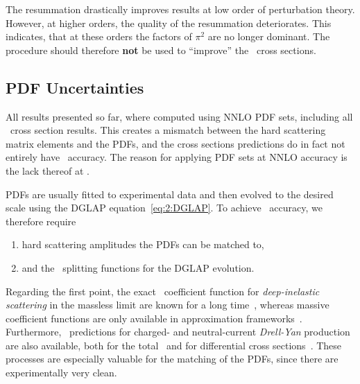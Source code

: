 The resummation drastically improves results at low order of perturbation theory. However, at higher orders, the quality of the resummation deteriorates. This indicates, that at these orders the factors of $\pi^2$ are no longer dominant. The procedure should therefore \textbf{not} be used to ``improve'' the \NNNLO\ cross sections.

\subsection{PDF Uncertainties}
All results presented so far, where computed using \acs{NNLO} \acs{PDF} sets, including all \NNNLO\ cross section results. This creates a mismatch between the hard scattering matrix elements and the \acs{PDF}s, and the cross sections predictions do in fact not entirely have \NNNLO\ accuracy. The reason for applying \acs{PDF} sets at \acs{NNLO} accuracy is the lack thereof at \NNNLO.

\acs{PDF}s are usually fitted to experimental data and then evolved to the desired scale using the DGLAP equation~\eqref{eq:2:DGLAP}. To achieve \NNNLO\ accuracy, we therefore require
\begin{enumerate}
  \item hard scattering amplitudes the \acs{PDF}s can be matched to,
  \item and the \NNNLO\ splitting functions for the DGLAP evolution.
\end{enumerate}
Regarding the first point, the exact \NNNLO\ coefficient function for \textit{deep-inelastic scattering} in the massless limit are known for a long time~\cite{Vermaseren:2005qc, Moch:2004xu, Moch:2007rq, Moch:2008fj, Davies:2016ruz, Blumlein:2022gpp}, whereas massive coefficient functions are only available in approximation frameworks~\cite{Kawamura:2012cr, Laurenti:2024anf}. Furthermore, \NNNLO\ predictions for charged- and neutral-current \textit{Drell-Yan} production are also available, both for the total~\cite{Baglio:2022wzu, Duhr:2020sdp, Duhr:2021vwj} and for differential cross sections~\cite{Chen:2021vtu, Chen:2022lwc}. These processes are especially valuable for the matching of the \acs{PDF}s, since there are experimentally very clean.

